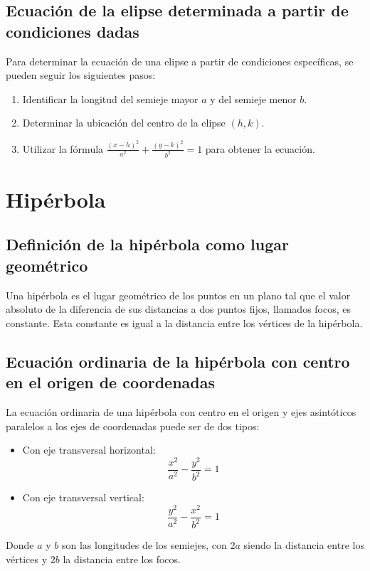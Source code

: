 \subsection{Ecuación de la elipse determinada a partir de condiciones dadas}
Para determinar la ecuación de una elipse a partir de condiciones específicas, se pueden seguir los siguientes pasos:
\begin{enumerate}
    \item Identificar la longitud del semieje mayor \(a\) y del semieje menor \(b\).
    \item Determinar la ubicación del centro de la elipse \((h, k)\).
    \item Utilizar la fórmula \(\frac{(x-h)^2}{a^2} + \frac{(y-k)^2}{b^2} = 1\) para obtener la ecuación.
\end{enumerate}


\section{Hipérbola} %

\subsection{Definición de la hipérbola como lugar geométrico}
Una hipérbola es el lugar geométrico de los puntos en un plano tal que el valor absoluto de la diferencia de sus distancias a dos puntos fijos, llamados focos, es constante. Esta constante es igual a la distancia entre los vértices de la hipérbola.

\subsection{Ecuación ordinaria de la hipérbola con centro en el origen de coordenadas}
La ecuación ordinaria de una hipérbola con centro en el origen y ejes asintóticos paralelos a los ejes de coordenadas puede ser de dos tipos:
\begin{itemize}
    \item Con eje transversal horizontal: 
    \[
    \frac{x^2}{a^2} - \frac{y^2}{b^2} = 1
    \]
    \item Con eje transversal vertical:
    \[
    \frac{y^2}{a^2} - \frac{x^2}{b^2} = 1
    \]
\end{itemize}
Donde \(a\) y \(b\) son las longitudes de los semiejes, con \(2a\) siendo la distancia entre los vértices y \(2b\) la distancia entre los focos.

